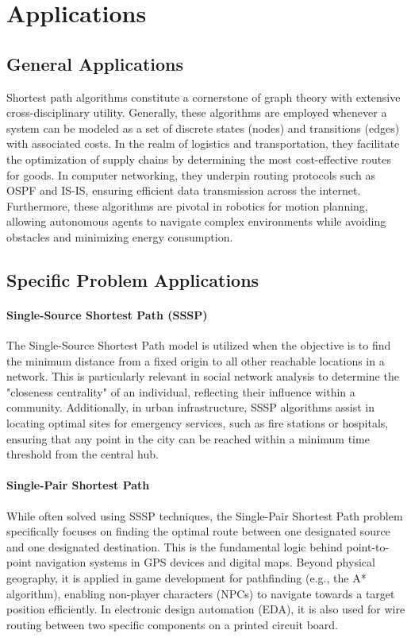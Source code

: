 \section{Applications}

\label{sec:applications}

\subsection{General Applications}
Shortest path algorithms constitute a cornerstone of graph theory with extensive cross-disciplinary utility. Generally, these algorithms are employed whenever a system can be modeled as a set of discrete states (nodes) and transitions (edges) with associated costs. In the realm of logistics and transportation, they facilitate the optimization of supply chains by determining the most cost-effective routes for goods. In computer networking, they underpin routing protocols such as OSPF and IS-IS, ensuring efficient data transmission across the internet. Furthermore, these algorithms are pivotal in robotics for motion planning, allowing autonomous agents to navigate complex environments while avoiding obstacles and minimizing energy consumption.

\subsection{Specific Problem Applications}

\paragraph{Single-Source Shortest Path (SSSP)}
The Single-Source Shortest Path model is utilized when the objective is to find the minimum distance from a fixed origin to all other reachable locations in a network. This is particularly relevant in social network analysis to determine the "closeness centrality" of an individual, reflecting their influence within a community. Additionally, in urban infrastructure, SSSP algorithms assist in locating optimal sites for emergency services, such as fire stations or hospitals, ensuring that any point in the city can be reached within a minimum time threshold from the central hub.

\paragraph{Single-Pair Shortest Path}
While often solved using SSSP techniques, the Single-Pair Shortest Path problem specifically focuses on finding the optimal route between one designated source and one designated destination. This is the fundamental logic behind point-to-point navigation systems in GPS devices and digital maps. Beyond physical geography, it is applied in game development for pathfinding (e.g., the A* algorithm), enabling non-player characters (NPCs) to navigate towards a target position efficiently. In electronic design automation (EDA), it is also used for wire routing between two specific components on a printed circuit board.

